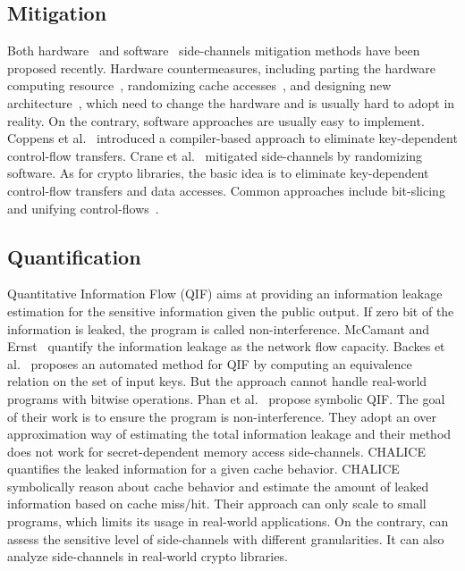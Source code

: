 \subsection{Mitigation}
Both hardware~\cite{Page2005PartitionedCA,
Wang:2007:NCD:1250662.1250723,Zhang:2015:HDL:2775054.2694372,Li:2014:SLH:2541940.2541947,
236344} and software~\cite{shih2017t,Coppens:2009:PMT:1607723.1608124,
brickell2006software,crane2015thwarting} side-channels mitigation methods have
been proposed recently. Hardware countermeasures, including parting the hardware
computing resource~\cite{Page2005PartitionedCA}, randomizing cache
accesses~\cite{Wang:2007:NCD:1250662.1250723, 236344}, and designing new
architecture~\cite{tiwari2011crafting}, which need to change the hardware and is
usually hard to adopt in reality. On the contrary, software approaches are
usually easy to implement. Coppens et
al.~\cite{Coppens:2009:PMT:1607723.1608124} introduced a compiler-based approach
to eliminate key-dependent control-flow transfers. Crane et
al.~\cite{crane2015thwarting} mitigated side-channels by randomizing software.
As for crypto libraries, the basic idea is to eliminate key-dependent
control-flow transfers and data accesses. Common approaches include
bit-slicing~\cite{konighofer2008fast,rebeiro2006bitslice} and unifying
control-flows~\cite{Coppens:2009:PMT:1607723.1608124}.

\subsection{Quantification}

Quantitative Information Flow (QIF) aims at providing an information leakage
estimation for the sensitive information given the public output. If zero bit
of the information is leaked, the program is called non-interference. McCamant
and Ernst~\cite{McCamantE2008} quantify the information leakage as the network
flow capacity. Backes et al.~\cite{5207642} proposes an automated method for QIF
by computing an equivalence relation on the set of input keys. But the approach
cannot handle real-world programs with bitwise operations. Phan et
al.~\cite{Phan:2012:SQI:2382756.2382791} propose symbolic QIF. The goal of their
work is to ensure the program is non-interference. They adopt an over
approximation way of estimating the total information leakage and their method
does not work for secret-dependent memory access side-channels.
CHALICE~\cite{Chattopadhyay:2017:QIL:3127041.3127044} quantifies the leaked
information for a given cache behavior. CHALICE symbolically reason about cache
behavior and estimate the amount of leaked information based on cache miss/hit.
Their approach can only scale to small programs, which limits its usage in
real-world applications. On the contrary, \tool{} can assess the sensitive level
of side-channels with different granularities. It can also analyze side-channels
in real-world crypto libraries.


